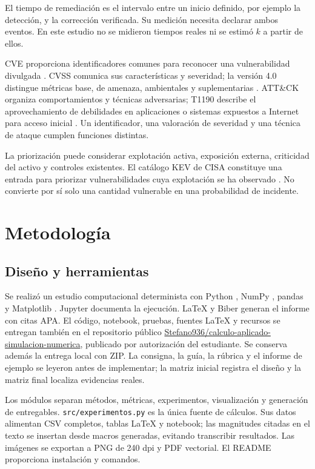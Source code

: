 \documentclass[11pt,a4paper]{article}
\begin{document}
El tiempo de remediación es el intervalo entre un inicio definido, por ejemplo la detección, y la corrección verificada. Su medición necesita declarar ambos eventos. En este estudio no se midieron tiempos reales ni se estimó $k$ a partir de ellos.

CVE proporciona identificadores comunes para reconocer una vulnerabilidad divulgada \parencite{cve}. CVSS comunica sus características y severidad; la versión 4.0 distingue métricas base, de amenaza, ambientales y suplementarias \parencite{cvss}. ATT\&CK organiza comportamientos y técnicas adversarias; T1190 describe el aprovechamiento de debilidades en aplicaciones o sistemas expuestos a Internet para acceso inicial \parencite{mitre}. Un identificador, una valoración de severidad y una técnica de ataque cumplen funciones distintas.

La priorización puede considerar explotación activa, exposición externa, criticidad del activo y controles existentes. El catálogo KEV de CISA constituye una entrada para priorizar vulnerabilidades cuya explotación se ha observado \parencite{cisa}. No convierte por sí solo una cantidad vulnerable en una probabilidad de incidente.

\section{Metodología}
\subsection{Diseño y herramientas}
Se realizó un estudio computacional determinista con Python \VersionPython{}, NumPy \VersionNumpy{}, pandas \VersionPandas{} y Matplotlib \VersionMatplotlib{}. Jupyter documenta la ejecución. LaTeX y Biber generan el informe con citas APA. El código, notebook, pruebas, fuentes LaTeX y recursos se entregan también en el repositorio público \href{https://github.com/Stefano936/calculo-aplicado-simulacion-numerica}{Stefano936/calculo-aplicado-simulacion-numerica}, publicado por autorización del estudiante. Se conserva además la entrega local con ZIP. La consigna, la guía, la rúbrica y el informe de ejemplo se leyeron antes de implementar; la matriz inicial registra el diseño y la matriz final localiza evidencias reales.

Los módulos separan métodos, métricas, experimentos, visualización y generación de entregables. \texttt{src/experimentos.py} es la única fuente de cálculos. Sus datos alimentan CSV completos, tablas LaTeX y notebook; las magnitudes citadas en el texto se insertan desde macros generadas, evitando transcribir resultados. Las imágenes se exportan a PNG de 240 dpi y PDF vectorial. El README proporciona instalación y comandos.
\end{document}
